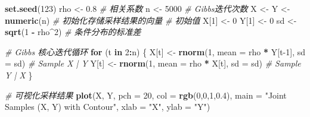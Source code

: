 \documentclass[
]{book}
\newenvironment{Shaded}{\begin{snugshade}}{\end{snugshade}}
\newcommand{\AttributeTok}[1]{\textcolor[rgb]{0.13,0.29,0.53}{#1}}
\newcommand{\CommentTok}[1]{\textcolor[rgb]{0.56,0.35,0.01}{\textit{#1}}}
\newcommand{\ControlFlowTok}[1]{\textcolor[rgb]{0.13,0.29,0.53}{\textbf{#1}}}
\newcommand{\DecValTok}[1]{\textcolor[rgb]{0.00,0.00,0.81}{#1}}
\newcommand{\FloatTok}[1]{\textcolor[rgb]{0.00,0.00,0.81}{#1}}
\newcommand{\FunctionTok}[1]{\textcolor[rgb]{0.13,0.29,0.53}{\textbf{#1}}}
\newcommand{\NormalTok}[1]{#1}
\newcommand{\OtherTok}[1]{\textcolor[rgb]{0.56,0.35,0.01}{#1}}
\newcommand{\SpecialCharTok}[1]{\textcolor[rgb]{0.81,0.36,0.00}{\textbf{#1}}}
\newcommand{\StringTok}[1]{\textcolor[rgb]{0.31,0.60,0.02}{#1}}
\begin{document}
\begin{Shaded}
\begin{Highlighting}[]
\FunctionTok{set.seed}\NormalTok{(}\DecValTok{123}\NormalTok{)}
\NormalTok{rho }\OtherTok{\textless{}{-}} \FloatTok{0.8} \CommentTok{\# 相关系数}
\NormalTok{n }\OtherTok{\textless{}{-}} \DecValTok{5000} \CommentTok{\# Gibbs迭代次数}
\NormalTok{X }\OtherTok{\textless{}{-}}\NormalTok{ Y }\OtherTok{\textless{}{-}} \FunctionTok{numeric}\NormalTok{(n) }\CommentTok{\# 初始化存储采样结果的向量}
\CommentTok{\# 初始值}
\NormalTok{X[}\DecValTok{1}\NormalTok{] }\OtherTok{\textless{}{-}} \DecValTok{0}
\NormalTok{Y[}\DecValTok{1}\NormalTok{] }\OtherTok{\textless{}{-}} \DecValTok{0}
\NormalTok{sd }\OtherTok{\textless{}{-}} \FunctionTok{sqrt}\NormalTok{(}\DecValTok{1} \SpecialCharTok{{-}}\NormalTok{ rho}\SpecialCharTok{\^{}}\DecValTok{2}\NormalTok{) }\CommentTok{\# 条件分布的标准差}

\CommentTok{\# Gibbs 核心迭代循环}
\ControlFlowTok{for}\NormalTok{ (t }\ControlFlowTok{in} \DecValTok{2}\SpecialCharTok{:}\NormalTok{n) \{}
\NormalTok{  X[t] }\OtherTok{\textless{}{-}} \FunctionTok{rnorm}\NormalTok{(}\DecValTok{1}\NormalTok{, }\AttributeTok{mean =}\NormalTok{ rho }\SpecialCharTok{*}\NormalTok{ Y[t}\DecValTok{{-}1}\NormalTok{], }\AttributeTok{sd =}\NormalTok{ sd) }\CommentTok{\# Sample X | Y}
\NormalTok{  Y[t] }\OtherTok{\textless{}{-}} \FunctionTok{rnorm}\NormalTok{(}\DecValTok{1}\NormalTok{, }\AttributeTok{mean =}\NormalTok{ rho }\SpecialCharTok{*}\NormalTok{ X[t], }\AttributeTok{sd =}\NormalTok{ sd)  }\CommentTok{\# Sample Y | X}
\NormalTok{\}}

\CommentTok{\# 可视化采样结果}
\FunctionTok{plot}\NormalTok{(X, Y, }\AttributeTok{pch =} \DecValTok{20}\NormalTok{, }\AttributeTok{col =} \FunctionTok{rgb}\NormalTok{(}\DecValTok{0}\NormalTok{,}\DecValTok{0}\NormalTok{,}\DecValTok{1}\NormalTok{,}\FloatTok{0.4}\NormalTok{),}
     \AttributeTok{main =} \StringTok{"Joint Samples (X, Y) with Contour"}\NormalTok{,}
     \AttributeTok{xlab =} \StringTok{"X"}\NormalTok{, }\AttributeTok{ylab =} \StringTok{"Y"}\NormalTok{)}


\end{Highlighting}
\end{Shaded}
\end{document}
